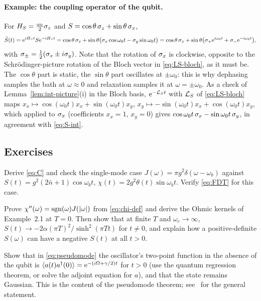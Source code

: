 \paragraph{Example: the coupling operator of the qubit.}
For $H_S=\frac{\omega_0}{2}\sigma_z$ and $S=\cos\theta\,\sigma_z+\sin\theta\,\sigma_x$,
\begin{equation}
  \tilde S(t)=\mathrm{e}^{iH_St}S\mathrm{e}^{-iH_St}=\cos\theta\,\sigma_z+\sin\theta\big(\sigma_x\cos\omega_0t-\sigma_y\sin\omega_0t\big)
  =\cos\theta\,\sigma_z+\sin\theta\big(\sigma_+\mathrm{e}^{i\omega_0t}+\sigma_-\mathrm{e}^{-i\omega_0t}\big),
  \label{eq:S-int}
\end{equation}
with $\sigma_\pm=\tfrac12(\sigma_x\pm i\sigma_y)$.
Note that the rotation of $\sigma_x$ is clockwise, opposite to the Schr\"odinger-picture rotation of the Bloch vector in \cref{eq:LS-bloch}, as it must be.
The $\cos\theta$ part is static, the $\sin\theta$ part oscillates at $\pm\omega_0$: this is why dephasing samples the bath at $\omega\approx0$ and relaxation samples it at $\omega=\pm\omega_0$.
As a check of Lemma~\ref{lem:int-picture}(i) in the Bloch basis, $\mathrm{e}^{-\mathcal{L}_St}$ with $\mathcal{L}_S$ of \cref{eq:LS-bloch} maps $x_x\mapsto\cos(\omega_0t)x_x+\sin(\omega_0t)x_y$, $x_y\mapsto-\sin(\omega_0t)x_x+\cos(\omega_0t)x_y$, which applied to $\sigma_x$ (coefficients $x_x=1$, $x_y=0$) gives $\cos\omega_0t\,\sigma_x-\sin\omega_0t\,\sigma_y$, in agreement with \cref{eq:S-int}.

\subsection{Exercises}

\begin{exercise}\label{ex:2-1}
Derive \cref{eq:C} and check the single-mode case $J(\omega)=\pi g^2\delta(\omega-\omega_b)$ against $S(t)=g^2(2\bar n+1)\cos\omega_bt$, $\chi(t)=2g^2\theta(t)\sin\omega_bt$.
Verify \cref{eq:FDT} for this case.
\end{exercise}

\begin{exercise}\label{ex:2-2}
Prove $\chi''(\omega)=\operatorname{sgn}(\omega)J(|\omega|)$ from \cref{eq:chi-def} and derive the Ohmic kernels of Example~2.1 at $T=0$.
Then show that at finite $T$ and $\omega_c\to\infty$, $S(t)\to-2\alpha(\pi T)^2/\sinh^2(\pi Tt)$ for $t\ne0$, and explain how a positive-definite $S(\omega)$ can have a negative $S(t)$ at all $t>0$.
\end{exercise}

\begin{exercise}\label{ex:2-3}
Show that in \cref{eq:pseudomode} the oscillator's two-point function in the absence of the qubit is $\langle a(t)a^\dagger(0)\rangle=\mathrm{e}^{-(i\Omega+\gamma/2)t}$ for $t>0$ (use the quantum regression theorem, or solve the adjoint equation for $a$), and that the state remains Gaussian.
This is the content of the pseudomode theorem; see~\cite{Tamascelli2018} for the general statement.
\end{exercise}

